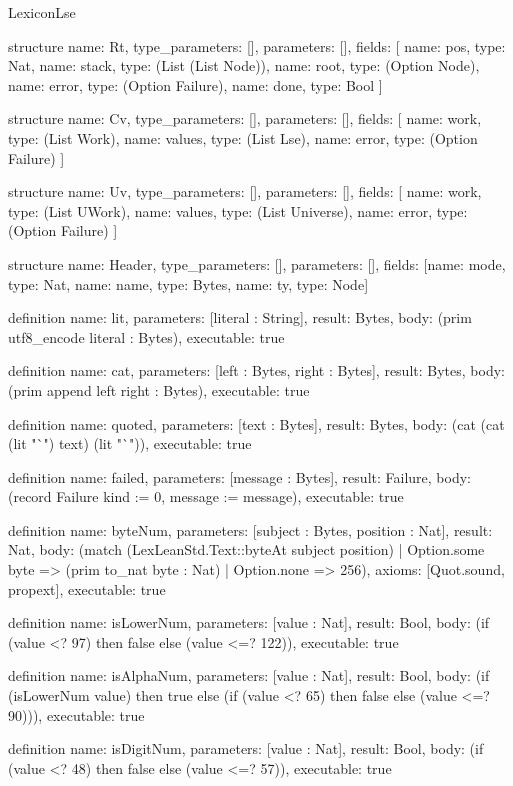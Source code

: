 \begin{lexlean}{LexiconLse}
\begin{semanticmodule}
structure{
  name: Rt,
  type_parameters: [],
  parameters: [],
  fields: [
    {name: pos, type: Nat},
    {name: stack, type: (List (List Node))},
    {name: root, type: (Option Node)},
    {name: error, type: (Option Failure)},
    {name: done, type: Bool}
  ]
}

structure{
  name: Cv,
  type_parameters: [],
  parameters: [],
  fields: [
    {name: work, type: (List Work)},
    {name: values, type: (List Lse)},
    {name: error, type: (Option Failure)}
  ]
}

structure{
  name: Uv,
  type_parameters: [],
  parameters: [],
  fields: [
    {name: work, type: (List UWork)},
    {name: values, type: (List Universe)},
    {name: error, type: (Option Failure)}
  ]
}

structure{
  name: Header,
  type_parameters: [],
  parameters: [],
  fields: [{name: mode, type: Nat}, {name: name, type: Bytes}, {name: ty, type: Node}]
}

definition{
  name: lit,
  parameters: [literal : String],
  result: Bytes,
  body: (prim utf8_encode literal : Bytes),
  executable: true
}

definition{
  name: cat,
  parameters: [left : Bytes, right : Bytes],
  result: Bytes,
  body: (prim append left right : Bytes),
  executable: true
}

definition{
  name: quoted,
  parameters: [text : Bytes],
  result: Bytes,
  body: (cat (cat (lit "`") text) (lit "`")),
  executable: true
}

definition{
  name: failed,
  parameters: [message : Bytes],
  result: Failure,
  body: (record Failure {kind := 0, message := message}),
  executable: true
}

definition{
  name: byteNum,
  parameters: [subject : Bytes, position : Nat],
  result: Nat,
  body: (match (LexLeanStd.Text::byteAt subject position)
    | Option.some byte => (prim to_nat byte : Nat)
    | Option.none => 256),
  axioms: [Quot.sound, propext],
  executable: true
}

definition{
  name: isLowerNum,
  parameters: [value : Nat],
  result: Bool,
  body: (if (value <? 97) then false else (value <=? 122)),
  executable: true
}

definition{
  name: isAlphaNum,
  parameters: [value : Nat],
  result: Bool,
  body: (if (isLowerNum value) then true else (if (value <? 65) then false else (value <=? 90))),
  executable: true
}

definition{
  name: isDigitNum,
  parameters: [value : Nat],
  result: Bool,
  body: (if (value <? 48) then false else (value <=? 57)),
  executable: true
}


\end{semanticmodule}
\end{lexlean}
